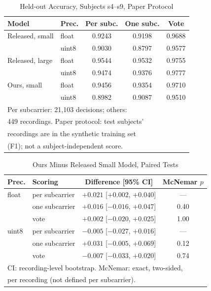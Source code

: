 \documentclass[journal]{IEEEtran}
\begin{document}
\begin{table}[!t]
\caption{Held-out Accuracy, Subjects s4--s9, Paper Protocol}
\label{tab:results}
\centering
\setlength{\tabcolsep}{4pt}
\begin{tabular}{llccc}
\hline
Model & Prec. & Per subc. & One subc. & Vote\\
\hline
Released, small  & float & 0.9243 & 0.9198 & 0.9688\\
                 & uint8 & 0.9030 & 0.8797 & 0.9577\\
Released, large  & float & 0.9544 & 0.9532 & 0.9755\\
                 & uint8 & 0.9474 & 0.9376 & 0.9777\\
Ours, small      & float & 0.9456 & 0.9354 & 0.9710\\
                 & uint8 & 0.8982 & 0.9087 & 0.9510\\
\hline
\multicolumn{5}{l}{\footnotesize Per subcarrier: 21{,}103 decisions; others:}\\
\multicolumn{5}{l}{\footnotesize 449 recordings. Paper protocol: test subjects'}\\
\multicolumn{5}{l}{\footnotesize recordings are in the synthetic training set}\\
\multicolumn{5}{l}{\footnotesize (F1); not a subject-independent score.}
\end{tabular}
\end{table}

\begin{table}[!t]
\caption{Ours Minus Released Small Model, Paired Tests}
\label{tab:stats}
\centering
\setlength{\tabcolsep}{3pt}
\begin{tabular}{llcc}
\hline
Prec. & Scoring & Difference [95\% CI] & McNemar $p$\\
\hline
float & per subcarrier & $+0.021$ [$+0.002$, $+0.040$] & ---\\
      & one subcarrier & $+0.016$ [$-0.016$, $+0.047$] & 0.40\\
      & vote           & $+0.002$ [$-0.020$, $+0.025$] & 1.00\\
uint8 & per subcarrier & $-0.005$ [$-0.027$, $+0.016$] & ---\\
      & one subcarrier & $+0.031$ [$-0.005$, $+0.069$] & 0.12\\
      & vote           & $-0.007$ [$-0.033$, $+0.020$] & 0.74\\
\hline
\multicolumn{4}{l}{\footnotesize CI: recording-level bootstrap. McNemar: exact,
two-sided,}\\
\multicolumn{4}{l}{\footnotesize per recording (not defined per subcarrier).}
\end{tabular}
\end{table}
\end{document}
